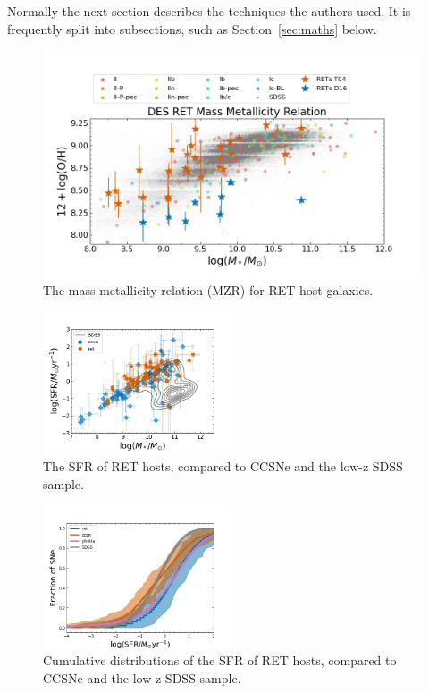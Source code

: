 \documentclass[fleqn,usenatbib,]{mnras}
\begin{document}
Normally the next section describes the techniques the authors used.
It is frequently split into subsections, such as Section~\ref{sec:maths} below.

\begin{figure}
\includegraphics[width=\textwidth]{figs/RET_MZR.png}
\caption{The mass-metallicity relation (MZR) for RET host galaxies.
\label{fig:mzr}}
\end{figure}

\begin{figure}
\includegraphics[width=0.5\textwidth]{figs/SFR_Mike.png}
\caption{The SFR of RET hosts, compared to CCSNe and the low-z SDSS sample.
\label{fig:sfms_sfr}}
\end{figure}

\begin{figure}
\includegraphics[width=0.5\textwidth]{figs/cum_SFR_mike.png}
\caption{Cumulative distributions of the SFR of RET hosts, compared to CCSNe and the low-z SDSS sample.
\label{fig:sfr_cum}}
\end{figure}
\end{document}
